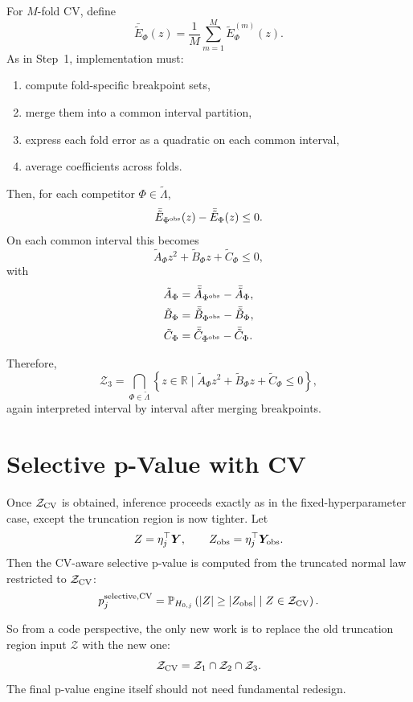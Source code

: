 \documentclass[11pt]{article}
\begin{document}
For $M$-fold CV, define
\[
\bar{\tilde{E}}_{\Phi}(z) = \frac{1}{M}\sum_{m=1}^{M} \tilde{E}_{\Phi}^{(m)}(z).
\]
As in Step~1, implementation must:
\begin{enumerate}[leftmargin=2em]
    \item compute fold-specific breakpoint sets,
    \item merge them into a common interval partition,
    \item express each fold error as a quadratic on each common interval,
    \item average coefficients across folds.
\end{enumerate}

Then, for each competitor $\Phi \in \tilde{\Lambda}$,
\[
\bar{\tilde{E}}_{\Phi^{\rm obs}}(z) - \bar{\tilde{E}}_{\Phi}(z) \le 0.
\]
On each common interval this becomes
\[
\tilde{A}_{\Phi} z^2 + \tilde{B}_{\Phi} z + \tilde{C}_{\Phi} \le 0,
\]
with
\begin{align*}
\tilde{A}_{\Phi} &= \bar{\tilde{A}}_{\Phi^{\rm obs}} - \bar{\tilde{A}}_{\Phi}, \\
\tilde{B}_{\Phi} &= \bar{\tilde{B}}_{\Phi^{\rm obs}} - \bar{\tilde{B}}_{\Phi}, \\
\tilde{C}_{\Phi} &= \bar{\tilde{C}}_{\Phi^{\rm obs}} - \bar{\tilde{C}}_{\Phi}.
\end{align*}

Therefore,
\[
\mathcal{Z}_3 = \bigcap_{\Phi \in \tilde{\Lambda}}
\left\{ z \in \mathbb{R} \mid \tilde{A}_{\Phi} z^2 + \tilde{B}_{\Phi} z + \tilde{C}_{\Phi} \le 0 \right\},
\]
again interpreted interval by interval after merging breakpoints.

\section{Selective p-Value with CV}
Once $\mathcal{Z}_{\rm CV}$ is obtained, inference proceeds exactly as in the fixed-hyperparameter case, except the truncation region is now tighter. Let
\[
Z = \eta_j^{\top}\bm{Y},
\qquad
Z_{\rm obs} = \eta_j^{\top}\bm{Y}_{\rm obs}.
\]
Then the CV-aware selective p-value is computed from the truncated normal law restricted to $\mathcal{Z}_{\rm CV}$:
\[
p^{\rm selective, CV}_j
=
\mathbb{P}_{H_{0,j}}
\left(
|Z| \ge |Z_{\rm obs}|
\;\middle|\;
Z \in \mathcal{Z}_{\rm CV}
\right).
\]

So from a code perspective, the only new work is to replace the old truncation region input $\mathcal{Z}$ with the new one:
\[
\mathcal{Z}_{\rm CV} = \mathcal{Z}_1 \cap \mathcal{Z}_2 \cap \mathcal{Z}_3.
\]
The final p-value engine itself should not need fundamental redesign.
\end{document}
